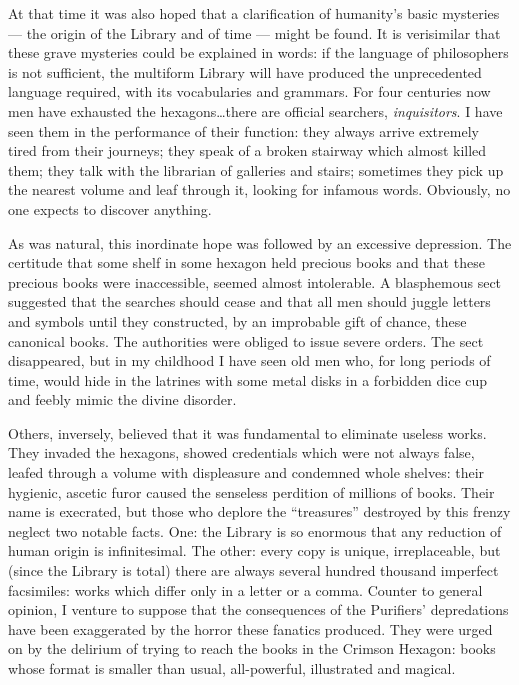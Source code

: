 \documentclass[oneside]{book}
\begin{document}
At that time it was also hoped that a clarification of humanity's basic mysteries --- the origin of the Library and of time --- might be found. It is verisimilar that these grave mysteries could be explained in words: if the language of philosophers is not sufficient, the multiform Library will have produced the unprecedented language required, with its vocabularies and grammars. For four centuries now men have exhausted the hexagons\dots there are official searchers, \emph{inquisitors}. I have seen them in the performance of their function: they always arrive extremely tired from their journeys; they speak of a broken stairway which almost killed them; they talk with the librarian of galleries and stairs; sometimes they pick up the nearest volume and leaf through it, looking for infamous words.
Obviously, no one expects to discover anything.

As was natural, this inordinate hope was followed by an excessive depression. The certitude that some shelf in some hexagon held precious books and that these precious books were inaccessible, seemed almost intolerable. A blasphemous sect suggested that the searches should cease and that all men should juggle letters and symbols until they constructed, by an improbable gift of chance, these canonical books. The authorities were obliged to issue severe orders. The sect disappeared, but in my childhood I have seen old men who, for long periods of time, would hide in the latrines with some metal disks in a forbidden dice cup and feebly mimic the divine disorder.

Others, inversely, believed that it was fundamental to eliminate useless works. They invaded the hexagons, showed credentials which were not always false, leafed through a volume with displeasure and condemned whole shelves: their hygienic, ascetic furor caused the senseless perdition of millions of books. Their name is execrated, but those who deplore the ``treasures'' destroyed by this frenzy neglect two notable facts. One: the Library is so enormous that any reduction of human origin is infinitesimal. The other: every copy is unique, irreplaceable, but (since the Library is total) there are always several hundred thousand imperfect facsimiles: works which differ only in a letter or a comma. Counter to general opinion, I venture to suppose that the consequences of the Purifiers' depredations have been exaggerated by the horror these fanatics produced. They were urged on by the delirium of trying to reach the books in the Crimson Hexagon: books whose format is smaller than usual, all-powerful, illustrated and magical.
\end{document}
